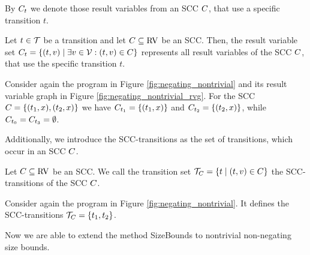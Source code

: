 By $C_t$ we denote those result variables from an SCC $C$, that use a specific transition $t$.

\begin{definition}
  Let $t \in \mathcal{T}$ be a transition and let $C \subseteq \text{RV}$ be an SCC.
  Then, the result variable set $C_t = \lbrace (t,v) \mid \exists v \in \mathcal{V} : (t,v) \in C \rbrace$ represents all result variables of the SCC $C$, that use the specific transition $t$.
\end{definition}

\begin{example}
  Consider again the program in Figure \ref{fig:negating_nontrivial} and its result variable graph in Figure \ref{fig:negating_nontrivial_rvg}.
  For the SCC $C = \lbrace (t_1,x), (t_2,x) \rbrace$ we have $C_{t_1} = \lbrace (t_1,x) \rbrace$ and $C_{t_2} = \lbrace (t_2,x) \rbrace$, while $C_{t_0} = C_{t_3} = \emptyset$.
\end{example}

Additionally, we introduce the SCC-transitions as the set of transitions, which occur in an SCC $C$.

\begin{definition}
  Let $C \subseteq \text{RV}$ be an SCC.
  We call the transition set $\mathcal{T}_C = \lbrace  t \mid (t,v) \in C \rbrace$ the SCC-transitions of the SCC $C$.
\end{definition}
  
\begin{example}
  Consider again the program in Figure \ref{fig:negating_nontrivial}.
  It defines the SCC-transitions $\mathcal{T}_C = \lbrace t_1, t_2 \rbrace$.
\end{example}

Now we are able to extend the method SizeBounds to nontrivial non-negating size bounds.



